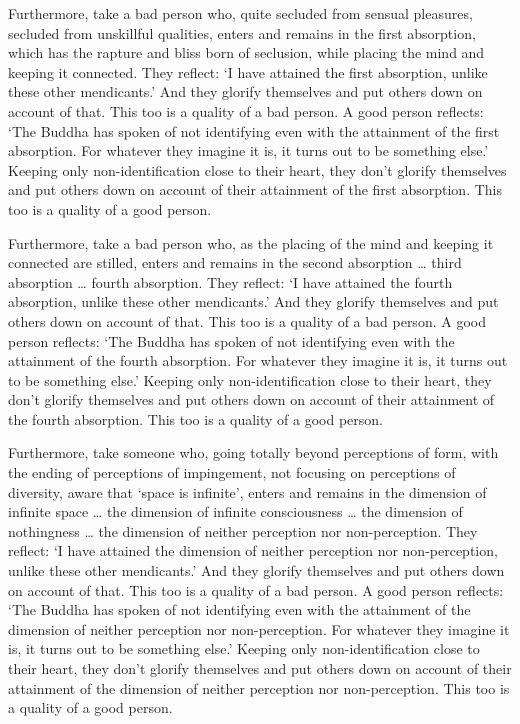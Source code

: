 \documentclass[12pt,openany]{book}%
\begin{document}
Furthermore, take a bad person who, quite secluded from sensual pleasures, secluded from unskillful qualities, enters and remains in the first absorption, which has the rapture and bliss born of seclusion, while placing the mind and keeping it connected. They reflect: ‘I have attained the first absorption, unlike these other mendicants.’ And they glorify themselves and put others down on account of that. This too is a quality of a bad person. A good person reflects: ‘The Buddha has spoken of not identifying even with the attainment of the first absorption. For whatever they imagine it is, it turns out to be something else.’ Keeping only non-identification close to their heart, they don’t glorify themselves and put others down on account of their attainment of the first absorption. This too is a quality of a good person. 

Furthermore, take a bad person who, as the placing of the mind and keeping it connected are stilled, enters and remains in the second absorption … third absorption … fourth absorption. They reflect: ‘I have attained the fourth absorption, unlike these other mendicants.’ And they glorify themselves and put others down on account of that. This too is a quality of a bad person. A good person reflects: ‘The Buddha has spoken of not identifying even with the attainment of the fourth absorption. For whatever they imagine it is, it turns out to be something else.’ Keeping only non-identification close to their heart, they don’t glorify themselves and put others down on account of their attainment of the fourth absorption. This too is a quality of a good person. 

Furthermore, take someone who, going totally beyond perceptions of form, with the ending of perceptions of impingement, not focusing on perceptions of diversity, aware that ‘space is infinite’, enters and remains in the dimension of infinite space … the dimension of infinite consciousness … the dimension of nothingness … the dimension of neither perception nor non-perception. They reflect: ‘I have attained the dimension of neither perception nor non-perception, unlike these other mendicants.’ And they glorify themselves and put others down on account of that. This too is a quality of a bad person. A good person reflects: ‘The Buddha has spoken of not identifying even with the attainment of the dimension of neither perception nor non-perception. For whatever they imagine it is, it turns out to be something else.’ Keeping only non-identification close to their heart, they don’t glorify themselves and put others down on account of their attainment of the dimension of neither perception nor non-perception. This too is a quality of a good person. 
\end{document}
